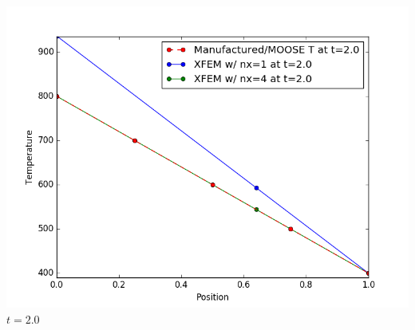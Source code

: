 \documentclass[]{beamer}
\begin{document}
\begin{frame}[t]
\begin{columns}
\begin{center}
			\includegraphics[scale=0.17]{figures/1D_xy_ls1m/1D_xy_ls1mat_u_vs_x_20}\\
			$t=2.0$
			\end{center}
	\end{columns}
\end{frame}
\end{document}
